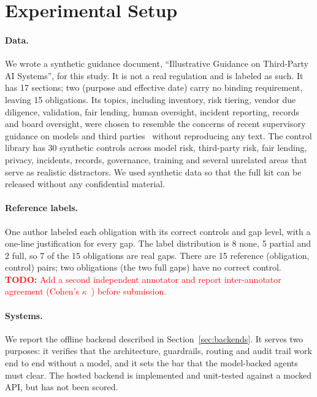 \documentclass[sigconf,review,anonymous]{acmart}
\newcommand{\todo}[1]{\textcolor{red}{\textbf{TODO:} #1}}
\newcommand{\gapnone}{\textsf{none}}
\newcommand{\gappartial}{\textsf{partial}}
\newcommand{\gapfull}{\textsf{full}}
\begin{document}
\section{Experimental Setup}
\label{sec:setup}

\paragraph{Data.}
We wrote a synthetic guidance document, ``Illustrative Guidance on
Third-Party AI Systems'', for this study. It is not a real regulation and is
labeled as such. It has 17 sections; two (purpose and effective date) carry
no binding requirement, leaving 15 obligations. Its topics, including
inventory, risk tiering, vendor due diligence, validation, fair lending,
human oversight, incident reporting, records and board oversight, were chosen
to resemble the concerns of recent supervisory guidance on models and third
parties~\cite{sr117,mrm2026,tprm2023} without reproducing any text. The control
library has 30 synthetic controls across model risk, third-party risk, fair
lending, privacy, incidents, records, governance, training and several
unrelated areas that serve as realistic distractors. We used synthetic data
so that the full kit can be released without any confidential material.

\paragraph{Reference labels.}
One author labeled each obligation with its correct controls and gap level,
with a one-line justification for every gap. The label distribution is 8
\gapnone{}, 5 \gappartial{} and 2 \gapfull{}, so 7 of the 15 obligations
are real gaps. There are 15 reference (obligation, control) pairs; two
obligations (the two \gapfull{} gaps) have no correct control.
\todo{Add a second independent annotator and report inter-annotator
agreement (Cohen's $\kappa$~\cite{cohen1960kappa}) before submission.}

\paragraph{Systems.}
We report the offline backend described in Section~\ref{sec:backends}. It
serves two purposes: it verifies that the architecture, guardrails, routing
and audit trail work end to end without a model, and it sets the bar that
the model-backed agents must clear. The hosted backend is implemented and
unit-tested against a mocked API, but has not been scored.
\end{document}
